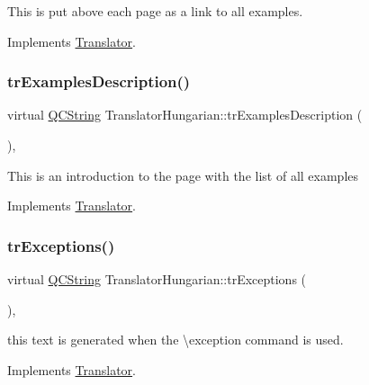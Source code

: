 This is put above each page as a link to all examples. 

Implements \mbox{\hyperlink{class_translator}{Translator}}.

\mbox{\label{class_translator_hungarian_a1f7834c20887c0900303ac2070f837b7}} 
\subsubsection{\texorpdfstring{trExamplesDescription()}{trExamplesDescription()}}
{\footnotesize\ttfamily virtual \mbox{\hyperlink{class_q_c_string}{Q\+C\+String}} Translator\+Hungarian\+::tr\+Examples\+Description (\begin{DoxyParamCaption}{ }\end{DoxyParamCaption})\hspace{0.3cm}{\ttfamily [inline]}, {\ttfamily [virtual]}}

This is an introduction to the page with the list of all examples 

Implements \mbox{\hyperlink{class_translator}{Translator}}.

\mbox{\label{class_translator_hungarian_ae9f0ff56e0e92ebabf08b526957db22d}} 
\subsubsection{\texorpdfstring{trExceptions()}{trExceptions()}}
{\footnotesize\ttfamily virtual \mbox{\hyperlink{class_q_c_string}{Q\+C\+String}} Translator\+Hungarian\+::tr\+Exceptions (\begin{DoxyParamCaption}{ }\end{DoxyParamCaption})\hspace{0.3cm}{\ttfamily [inline]}, {\ttfamily [virtual]}}

this text is generated when the \textbackslash{}exception command is used. 

Implements \mbox{\hyperlink{class_translator}{Translator}}.

\mbox{\label{class_translator_hungarian_ab1d0f39b1a3f212429af6d5997e94e3b}} 

